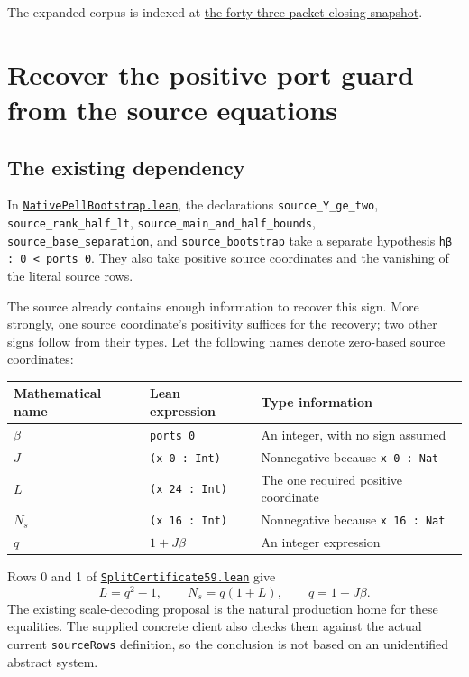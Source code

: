 \documentclass[11pt,letterpaper]{article}
\newcommand{\code}[1]{{\small\urlstyle{tt}\nolinkurl{#1}}}
\newcommand{\source}[2]{\href{https://github.com/VladimirReshetnikov/ProveIt/blob/f00ba53b331833c6cb64707bd90e48489e5610f5/#1}{#2}}
\newcommand{\module}[1]{\code{#1.lean}}
\begin{document}
The expanded corpus is indexed at
\href{https://github.com/VladimirReshetnikov/ProveIt/tree/60fcb2a69b7f1fdd4c3592ea5f164223cad50abe/Computability/DiophantineConsistency/research/lean-proof-simplification}{the forty-three-packet closing snapshot}.

\section{Recover the positive port guard from the source equations}
\label{sec:guard}

\subsection{The existing dependency}

In \source{Computability/DiophantineConsistency/Lean/DiophantineConsistency/NativePellBootstrap.lean}{\module{NativePellBootstrap}}, the declarations
\code{source_Y_ge_two}, \code{source_rank_half_lt}, \code{source_main_and_half_bounds}, \code{source_base_separation}, and \code{source_bootstrap} take a separate hypothesis \code{hβ : 0 < ports 0}. They also take positive source coordinates and the vanishing of the literal source rows.

The source already contains enough information to recover this sign. More strongly, one source coordinate's positivity suffices for the recovery; two other signs follow from their types. Let the following names denote zero-based source coordinates:

\begin{center}
\begin{tabular}{@{}lll@{}}
\toprule
Mathematical name & Lean expression & Type information\\
\midrule
$\beta$ & \code{ports 0} & An integer, with no sign assumed\\
$J$ & \code{(x 0 : Int)} & Nonnegative because \code{x 0 : Nat}\\
$L$ & \code{(x 24 : Int)} & The one required positive coordinate\\
$N_s$ & \code{(x 16 : Int)} & Nonnegative because \code{x 16 : Nat}\\
$q$ & $1+J\beta$ & An integer expression\\
\bottomrule
\end{tabular}
\end{center}

Rows 0 and 1 of \source{Computability/DiophantineConsistency/Lean/DiophantineConsistency/SplitCertificate59.lean}{\module{SplitCertificate59}} give
\begin{equation}
 L=q^2-1,\qquad N_s=q(1+L),\qquad q=1+J\beta.
 \label{eq:scales}
\end{equation}
The existing scale-decoding proposal is the natural production home for these equalities. The supplied concrete client also checks them against the actual current \code{sourceRows} definition, so the conclusion is not based on an unidentified abstract system.
\end{document}

